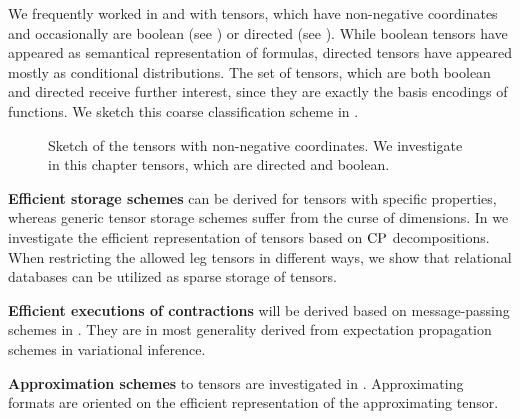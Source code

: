 
We frequently worked in  and  with tensors, which have non-negative coordinates and occasionally are boolean (see ) or directed (see ).
While boolean tensors have appeared as semantical representation of formulas, directed tensors have appeared mostly as conditional distributions.
The set of tensors, which are both boolean and directed receive further interest, since they are exactly the basis encodings of functions.
We sketch this coarse classification scheme in .
\begin{figure}[h]
    \begin{center}
        
    \end{center}
    \caption{Sketch of the tensors with non-negative coordinates.
    We investigate in this chapter tensors, which are directed and boolean.}\label{fig:dbTensorSketch}
\end{figure}


\textbf{Efficient storage schemes} can be derived for tensors with specific properties, whereas generic tensor storage schemes suffer from the curse of dimensions.
In  we investigate the efficient representation of tensors based on $\mathrm{CP}$ decompositions.
When restricting the allowed leg tensors in different ways, we show that relational databases can be utilized as sparse storage of tensors.

\textbf{Efficient executions of contractions} will be derived based on message-passing schemes in .
They are in most generality derived from expectation propagation schemes in variational inference.

\textbf{Approximation schemes} to tensors are investigated in .
Approximating formats are oriented on the efficient representation of the approximating tensor.
